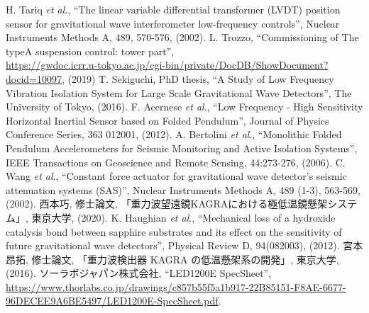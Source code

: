 \vspace{6mm}
 H. Tariq \textit{et al}., ``The linear variable differential transformer (LVDT) position sensor for gravitational wave interferometer low-frequency controls'', Nuclear Instruments Methods A, 489, 570-576, (2002). 
\vspace{2mm}
 L. Trozzo, ``Commissioning of The typeA suspension control: tower part'',\\\href{https://gwdoc.icrr.u-tokyo.ac.jp/cgi-bin/private/DocDB/ShowDocument?docid=10097}{https://gwdoc.icrr.u-tokyo.ac.jp/cgi-bin/private/DocDB/ShowDocument?docid=10097}, (2019)
\vspace{2mm}
 T. Sekiguchi, PhD thesis, ``A Study of Low Frequency Vibration Isolation System for Large Scale Gravitational Wave Detectors'', The University of Tokyo, (2016).
\vspace{2mm}
 F. Acernese \textit{et al}., ``Low Frequency - High Sensitivity Horizontal Inertial Sensor based on Folded Pendulum'', Journal of Physics Conference Series, 363 012001, (2012).
\vspace{2mm}
 A. Bertolini \textit{et al}., ``Monolithic Folded Pendulum Accelerometers for Seismic Monitoring and Active Isolation Systems'', IEEE Transactions on Geoscience and Remote Sensing, 44:273-276, (2006).
\vspace{2mm}
 C. Wang \textit{et al}., ``Constant force actuator for gravitational wave detector’s seismic attenuation systems (SAS)'', Nuclear Instruments Methods A, 489 (1-3), 563-569, (2002). 
\vspace{2mm}
 西本巧, 修士論文, 「重力波望遠鏡KAGRAにおける極低温鏡懸架システム」, 東京大学, (2020).
\vspace{2mm}
 K. Haughian \textit{et al}., ``Mechanical loss of a hydroxide catalysis bond between sapphire substrates and its effect on the sensitivity of future gravitational wave detectors'', Physical Review D, 94(082003), (2012).
\vspace{2mm}
 宮本昂拓, 修士論文, 「重力波検出器 KAGRA の低温懸架系の開発」, 東京大学, (2016).
\vspace{2mm}
 ソーラボジャパン株式会社, ``LED1200E SpecSheet'', \href{https://www.thorlabs.co.jp/drawings/c857b55f5a1b917-22B85151-F8AE-6677-96DECEE9A6BE5497/LED1200E-SpecSheet.pdf}{https://www.thorlabs.co.jp/drawings/c857b55f5a1b917-22B85151-F8AE-6677-96DECEE9A6BE5497/LED1200E-SpecSheet.pdf}.
